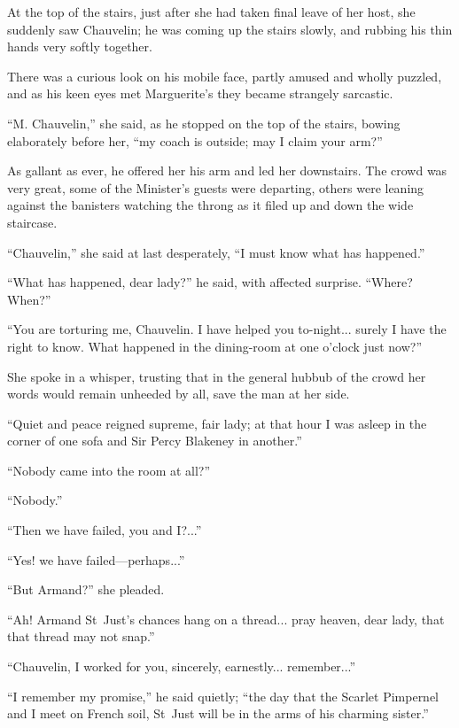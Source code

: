 At the top of the stairs, just after she had taken final leave of her host, she suddenly saw Chauvelin; he was coming up the stairs slowly, and rubbing his thin hands very softly together.

There was a curious look on his mobile face, partly amused and wholly puzzled, and as his keen eyes met Marguerite's they became strangely sarcastic.

\enquote{M. Chauvelin,} she said, as he stopped on the top of the stairs, bowing elaborately before her, \enquote{my coach is outside; may I claim your arm?}

As gallant as ever, he offered her his arm and led her downstairs. The crowd was very great, some of the Minister's guests were departing, others were leaning against the banisters watching the throng as it filed up and down the wide staircase.

\enquote{Chauvelin,} she said at last desperately, \enquote{I must know what has happened.}

\enquote{What has happened, dear lady?} he said, with affected surprise. \enquote{Where? When?}

\enquote{You are torturing me, Chauvelin. I have helped you to-night... surely I have the right to know. What happened in the dining-room at one o'clock just now?}

She spoke in a whisper, trusting that in the general hubbub of the crowd her words would remain unheeded by all, save the man at her side.

\enquote{Quiet and peace reigned supreme, fair lady; at that hour I was asleep in the corner of one sofa and Sir Percy Blakeney in another.}

\enquote{Nobody came into the room at all?}

\enquote{Nobody.}

\enquote{Then we have failed, you and I?...}

\enquote{Yes! we have failed---perhaps...}

\enquote{But Armand?} she pleaded.

\enquote{Ah! Armand St~Just's chances hang on a thread... pray heaven, dear lady, that that thread may not snap.}

\enquote{Chauvelin, I worked for you, sincerely, earnestly... remember...}

\enquote{I remember my promise,} he said quietly; \enquote{the day that the Scarlet Pimpernel and I meet on French soil, St~Just will be in the arms of his charming sister.}

